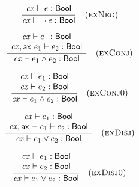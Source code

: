 
\begin{theorem}\label{thm-enega}
{\rm
\[
\frac{\begin{array}{c}\mathit{cx}\vdash e:\mathsf{Bool}\end{array}}{\mathit{cx}\vdash\neg\;e:\mathsf{Bool}}\quad\mbox{(\textsc{exNeg})}
\]
}
\end{theorem}

\begin{theorem}\label{thm-econj}
{\rm
\[
\frac{\begin{array}{c}\mathit{cx}\vdash e_1:\mathsf{Bool}\\\mathit{cx},\mathsf{ax}\ e_1\vdash e_2:\mathsf{Bool}\end{array}}{\mathit{cx}\vdash e_1\wedge e_2:\mathsf{Bool}}\quad\mbox{(\textsc{exConj})}
\]
}
\end{theorem}

\begin{theorem}\label{thm-econjO}
{\rm
\[
\frac{\begin{array}{c}\mathit{cx}\vdash e_1:\mathsf{Bool}\\\mathit{cx}\vdash e_2:\mathsf{Bool}\end{array}}{\mathit{cx}\vdash e_1\wedge e_2:\mathsf{Bool}}\quad\mbox{(\textsc{exConj0})}
\]
}
\end{theorem}

\begin{theorem}\label{thm-edisj}
{\rm
\[
\frac{\begin{array}{c}\mathit{cx}\vdash e_1:\mathsf{Bool}\\\mathit{cx},\mathsf{ax}\ \neg\;e_1\vdash e_2:\mathsf{Bool}\end{array}}{\mathit{cx}\vdash e_1\vee e_2:\mathsf{Bool}}\quad\mbox{(\textsc{exDisj})}
\]
}
\end{theorem}

\begin{theorem}\label{thm-edisjO}
{\rm
\[
\frac{\begin{array}{c}\mathit{cx}\vdash e_1:\mathsf{Bool}\\\mathit{cx}\vdash e_2:\mathsf{Bool}\end{array}}{\mathit{cx}\vdash e_1\vee e_2:\mathsf{Bool}}\quad\mbox{(\textsc{exDisj0})}
\]
}
\end{theorem}

